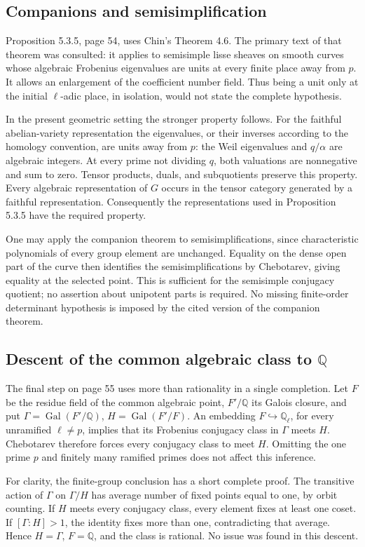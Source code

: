 \documentclass[10pt]{article}
\begin{document}
\subsection*{Companions and semisimplification}
Proposition 5.3.5, page 54, uses Chin’s Theorem 4.6. The primary text of that theorem was consulted: it applies to semisimple lisse sheaves on smooth curves whose algebraic Frobenius eigenvalues are units at every finite place away from \(p\). It allows an enlargement of the coefficient number field. Thus being a unit only at the initial \(\ell\)-adic place, in isolation, would not state the complete hypothesis.\par
In the present geometric setting the stronger property follows. For the faithful abelian-variety representation the eigenvalues, or their inverses according to the homology convention, are units away from \(p\): the Weil eigenvalues and \(q/\alpha\) are algebraic integers. At every prime not dividing \(q\), both valuations are nonnegative and sum to zero. Tensor products, duals, and subquotients preserve this property. Every algebraic representation of \(G\) occurs in the tensor category generated by a faithful representation. Consequently the representations used in Proposition 5.3.5 have the required property.\par
One may apply the companion theorem to semisimplifications, since characteristic polynomials of every group element are unchanged. Equality on the dense open part of the curve then identifies the semisimplifications by Chebotarev, giving equality at the selected point. This is sufficient for the semisimple conjugacy quotient; no assertion about unipotent parts is required. No missing finite-order determinant hypothesis is imposed by the cited version of the companion theorem.\par
\subsection*{Descent of the common algebraic class to \(\mathbb Q\)}
The final step on page 55 uses more than rationality in a single completion. Let \(F\) be the residue field of the common algebraic point, \(F'/\mathbb Q\) its Galois closure, and put \(\Gamma=\operatorname{Gal}(F'/\mathbb Q)\), \(H=\operatorname{Gal}(F'/F)\). An embedding \(F\hookrightarrow\mathbb Q_\ell\), for every unramified \(\ell\ne p\), implies that its Frobenius conjugacy class in \(\Gamma\) meets \(H\). Chebotarev therefore forces every conjugacy class to meet \(H\). Omitting the one prime \(p\) and finitely many ramified primes does not affect this inference.\par
For clarity, the finite-group conclusion has a short complete proof. The transitive action of \(\Gamma\) on \(\Gamma/H\) has average number of fixed points equal to one, by orbit counting. If \(H\) meets every conjugacy class, every element fixes at least one coset. If \([\Gamma:H]>1\), the identity fixes more than one, contradicting that average. Hence \(H=\Gamma\), \(F=\mathbb Q\), and the class is rational. No issue was found in this descent.\par
\end{document}
